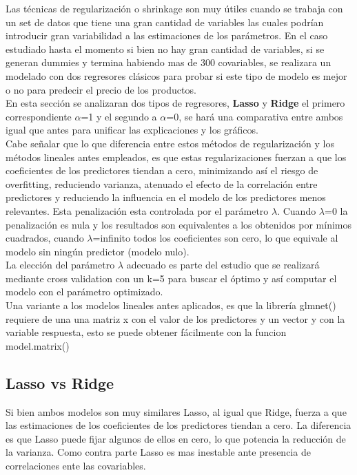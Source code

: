 Las técnicas de regularización o shrinkage son muy útiles cuando se trabaja con un set de datos que tiene una gran cantidad de variables las cuales podrían introducir gran variabilidad a las estimaciones de los parámetros. En el caso estudiado hasta el momento si bien no hay gran cantidad de variables, si se generan dummies y termina habiendo mas de 300 covariables, se realizara un modelado con dos regresores clásicos para probar si este tipo de modelo es mejor o no para predecir el precio de los productos.\\
En esta sección se analizaran dos tipos de regresores, \textbf{Lasso} y \textbf{Ridge} el primero correspondiente $\alpha$=1 y el segundo a $\alpha$=0, se hará una comparativa entre ambos igual que antes para unificar las explicaciones y los gráficos.\\
Cabe señalar que lo que diferencia entre estos métodos de regularización y los métodos lineales antes empleados, es que estas regularizaciones fuerzan a que los coeficientes de los predictores tiendan a cero, minimizando así el riesgo de overfitting, reduciendo varianza, atenuado el efecto de la correlación entre predictores y reduciendo la influencia en el modelo de los predictores menos relevantes.
Esta penalización esta controlada por el parámetro $\lambda$. Cuando $\lambda$=0 la penalización es nula y los resultados son equivalentes a los obtenidos por mínimos cuadrados, cuando $\lambda$=infinito todos los coeficientes son cero, lo que equivale al modelo sin ningún predictor (modelo nulo).\\
La elección del parámetro $\lambda$ adecuado es parte del estudio que se realizará mediante cross validation con un k=5 para buscar el óptimo y así computar el modelo con el parámetro optimizado.\\
Una variante a los modelos lineales antes aplicados, es que la librería glmnet() \cite{glmnet} requiere de una una matriz x con el valor de los predictores y un vector y con la variable respuesta, esto se puede obtener fácilmente con la funcion model.matrix()



\subsection{Lasso vs Ridge}

Si bien ambos modelos son muy similares Lasso, al igual que Ridge, fuerza a que las estimaciones de los coeficientes de los predictores tiendan a cero. La diferencia es que Lasso puede fijar algunos de ellos en cero, lo que potencia la reducción de la varianza.
Como contra parte Lasso es mas inestable ante presencia de correlaciones ente las covariables.


